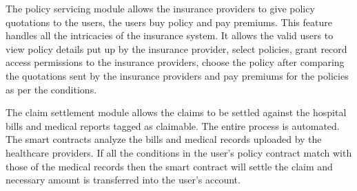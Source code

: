 The policy servicing module allows the insurance providers to give policy quotations to the users, the users buy policy and pay premiums. This feature handles all the intricacies of the insurance system. It allows the valid users to view policy details put up by the insurance provider, select policies, grant record access permissions to the insurance providers, choose the policy after comparing the quotations sent by the insurance providers and pay premiums for the policies as per the conditions.

The claim settlement module allows the claims to be settled against the hospital bills and medical reports tagged as claimable. The entire process is automated. The smart contracts analyze the bills and medical records uploaded by the healthcare providers. If all the conditions in the user’s policy contract match with those of the medical records then the smart contract will settle the claim and necessary amount is transferred into the user’s account.

